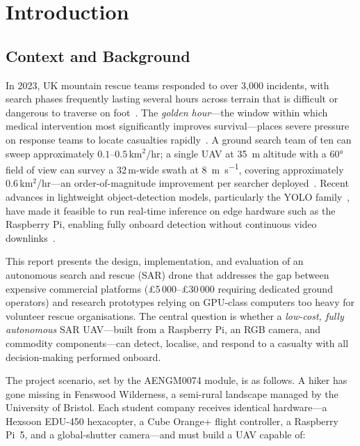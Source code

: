 \section*{Introduction}\label{sec:intro-d6}


\subsection*{Context and Background}

In 2023, UK mountain rescue teams responded to over 3{,}000 incidents, with search phases frequently lasting several hours across terrain that is difficult or dangerous to traverse on foot~\cite{mra2023}. The \textit{golden hour}---the window within which medical intervention most significantly improves survival---places severe pressure on response teams to locate casualties rapidly~\cite{goodrich2008}. A ground search team of ten can sweep approximately $0.1$--$0.5$\,km$^{2}$/hr; a single UAV at \SI{35}{\metre} altitude with a \ang{60} field of view can survey a 32\,m-wide swath at \SI{8}{\metre\per\second}, covering approximately $0.6$\,km$^{2}$/hr---an order-of-magnitude improvement per searcher deployed~\cite{goodrich2008, murphy2014}. Recent advances in lightweight object-detection models, particularly the YOLO family~\cite{yolohistory, yolov8}, have made it feasible to run real-time inference on edge hardware such as the Raspberry Pi, enabling fully onboard detection without continuous video downlinks~\cite{edgeai}.

This report presents the design, implementation, and evaluation of an autonomous search and rescue (SAR) drone that addresses the gap between expensive commercial platforms (\pounds5\,000--\pounds30\,000 requiring dedicated ground operators) and research prototypes relying on GPU-class computers too heavy for volunteer rescue organisations. The central question is whether a \textit{low-cost, fully autonomous} SAR UAV---built from a Raspberry Pi, an RGB camera, and commodity components---can detect, localise, and respond to a casualty with all decision-making performed onboard.

The project scenario, set by the AENGM0074 module, is as follows. A hiker has gone missing in Fenswood Wilderness, a semi-rural landscape managed by the University of Bristol. Each student company receives identical hardware---a Hexsoon EDU-450 hexacopter, a Cube Orange+ flight controller, a Raspberry Pi~5, and a global-shutter camera---and must build a UAV capable of:

